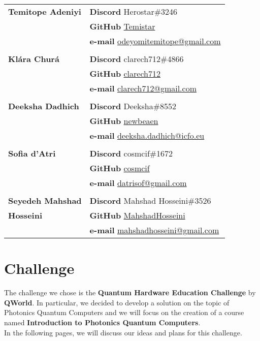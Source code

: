 \documentclass[hidelinks, a4paper,12pt]{article}
\begin{document}
\begin{tabular}{p{.275\linewidth} p{.65\linewidth}}
\textbf{Temitope Adeniyi} &\textbf{Discord} Herostar\#3246\\[.3em]
                        &\textbf{GitHub} \href{https://github.com/Temistar}{Temistar}\\[.3em]
                        &\textbf{e-mail} \href{mailto:odeyomitemitope@gmail.com}{odeyomitemitope@gmail.com}\\[.5em]
\\
\textbf{Klára Churá} &\textbf{Discord} clarech712\#4866\\[.3em]
                        &\textbf{GitHub} \href{https://github.com/clarech712}{clarech712}\\[.3em]
                        &\textbf{e-mail} \href{mailto:clarech712@gmail.com}{clarech712@gmail.com}\\[.5em]
\\
\textbf{Deeksha Dadhich} &\textbf{Discord} Deeksha\#8552\\[.3em]
                        &\textbf{GitHub} \href{https://github.com/newbeaen}{newbeaen}\\[.3em]
                        &\textbf{e-mail} \href{mailto:deeksha.dadhich@icfo.eu}{deeksha.dadhich@icfo.eu}\\[.5em]
\\
\textbf{Sofia d'Atri} &\textbf{Discord} cosmcif\#1672\\[.3em]
                        &\textbf{GitHub} \href{https://github.com/cosmcif}{cosmcif}\\[.3em]
                        &\textbf{e-mail} \href{mailto:datrisof@gmail.com}{datrisof@gmail.com}\\[.5em]
\\
\textbf{Seyedeh Mahshad} &\textbf{Discord} Mahshad Hosseini\#3526\\[.3em]
\textbf{Hosseini} &\textbf{GitHub} \href{https://github.com/MahshadHosseini}{MahshadHosseini}\\[.3em]
                        &\textbf{e-mail} \href{mailto:mahshadhosseini@gmail.com}{mahshadhosseini@gmail.com}\\[.5em]
\end{tabular}

\section{Challenge}
The challenge we chose is the \textbf{Quantum Hardware Education Challenge} by \textbf{QWorld}. In particular, we decided to develop a solution on the topic of Photonics Quantum Computers and we will focus on the creation of a course named \textbf{Introduction to Photonics Quantum Computers}.\\In the following pages, we will discuss our ideas and plans for this challenge.
\end{document}
